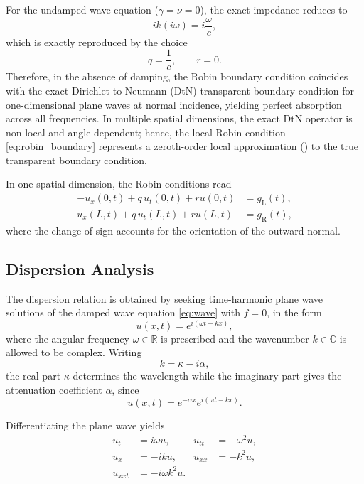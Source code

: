 \documentclass{Configuration_Files/PoliMi3i_thesis}
\newif\ifshowthesischanges
\DeclareRobustCommand{\thesischange}[2]{%
    \ifshowthesischanges
        \textcolor{#1}{#2}%
    \else
        #2%
    \fi
}
\def\thesischange#1#2{#2}%
\begin{document}
For the undamped wave equation (\(\gamma=\nu=0\)), the exact impedance reduces to
\begin{equation*}
ik(i\omega)
=
i\frac{\omega}{c},
\end{equation*}
which is exactly reproduced by the choice
\begin{equation*}
q=\frac{1}{c},
\qquad
r=0.
\end{equation*}
\thesischange{blue}{Therefore, in the absence of damping, the Robin boundary condition coincides with the exact Dirichlet-to-Neumann (DtN) transparent boundary condition for one-dimensional plane waves at normal incidence, yielding perfect absorption across all frequencies. In multiple spatial dimensions, the exact DtN operator is non-local and angle-dependent; hence, the local Robin condition \eqref{eq:robin_boundary} represents a zeroth-order local approximation (\cite{engquist_absorbing_1977,dolean_introduction_2015}) to the true transparent boundary condition.}

In one spatial dimension, the Robin conditions read
\begin{align*}
-u_x(0,t)
+
q\,u_t(0,t)
+
ru(0,t)
&=
g_{\mathrm L}(t),
\\
u_x(L,t)
+
q\,u_t(L,t)
+
ru(L,t)
&=
g_{\mathrm R}(t),
\end{align*}
where the change of sign accounts for the orientation of the outward normal.

\subsection{Dispersion Analysis} \label{sec:dispersion_analysis}

The dispersion relation is obtained by seeking time-harmonic plane wave solutions of the damped wave equation \eqref{eq:wave} with \(f=0\), in the form
\begin{equation*}
u(x,t)
=
e^{i(\omega t-kx)},
\end{equation*}
where the angular frequency \(\omega\in\mathbb{R}\) is prescribed and the wavenumber
\(
k\in\mathbb{C}
\)
is allowed to be complex. Writing
\[
k=\kappa-i\alpha,
\]
the real part \(\kappa\) determines the wavelength while the imaginary part gives the attenuation coefficient \(\alpha\), since
\[
u(x,t)
=
e^{-\alpha x}
e^{i(\omega t-k x)}.
\]

Differentiating the plane wave yields
\begin{align*}
u_t
&=
i\omega u,
&
u_{tt}
&=
-\omega^2u,
\\
u_x
&=
-iku,
&
u_{xx}
&=
-k^2u,
\\
u_{xxt}
&=
-i\omega k^2u.
\end{align*}
\end{document}
